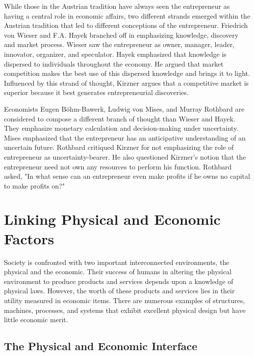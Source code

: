 While those in the Austrian tradition have always seen the entrepreneur as having a central role in economic affairs, two different strands emerged within the Austrian tradition that led to different conceptions of the entrepreneur. Friedrich von Wieser and F.A. Hayek branched off in emphasizing knowledge, discovery and market process. Wieser saw the entrepreneur as owner, manager, leader, innovator, organizer, and speculator. Hayek emphasized that knowledge is dispersed to individuals throughout the economy. He argued that market competition makes the best use of this dispersed knowledge and brings it to light. Influenced by this strand of thought, Kirzner argues that a competitive market is superior because it best generates entrepreneurial discoveries.

Economists Eugen Böhm-Bawerk, Ludwig von Mises, and Murray Rothbard are considered to compose a different branch of thought than Wieser and Hayek. They emphasize monetary calculation and decision-making under uncertainty. Mises emphasized that the entrepreneur has an anticipative understanding of an uncertain future. Rothbard critiqued Kirzner for not emphasizing the role of entrepreneur as uncertainty-bearer. He also questioned Kirzner's notion that the entrepreneur need not own any resources to perform his function. Rothbard asked, "In what sense can an entrepreneur even make profits if he owns no capital to make profits on?"


\section{Linking Physical and Economic Factors}

Society is confronted with two important interconnected environments, the physical and the economic. Their success of humans in altering the physical environment to produce products and services depends upon a knowledge of physical laws. However, the worth of these products and services lies in their utility measured in economic items. There are numerous examples of structures, machines, processes, and systems that exhibit excellent physical design but have little economic merit.

\subsection{The Physical and Economic Interface}

